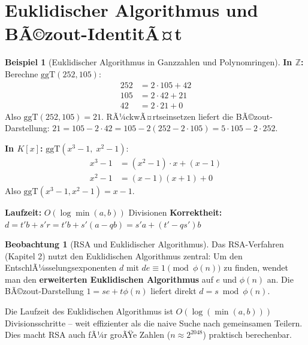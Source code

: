 ﻿\documentclass[a4paper,12pt]{report}
\theoremstyle{definition}
\newtheorem{beispiel}{Beispiel}
\newtheorem{beobachtung}{Beobachtung}
\begin{document}
\section{Euklidischer Algorithmus und BÃ©zout-IdentitÃ¤t}

\begin{beispiel}[Euklidischer Algorithmus in Ganzzahlen und Polynomringen]
    \textbf{In $\mathbb{Z}$:} Berechne $\mathrm{ggT}(252, 105)$:
    \begin{align*}
        252 &= 2 \cdot 105 + 42 \\
        105 &= 2 \cdot 42 + 21 \\
        42  &= 2 \cdot 21 + 0
    \end{align*}
    Also $\mathrm{ggT}(252, 105) = 21$. RÃ¼ckwÃ¤rtseinsetzen liefert die
    BÃ©zout-Darstellung: $21 = 105 - 2 \cdot 42 = 105 - 2(252 - 2 \cdot 105)
    = 5 \cdot 105 - 2 \cdot 252$.

    \textbf{In $K[x]$:} $\mathrm{ggT}(x^3 - 1,\; x^2 - 1)$:
    \begin{align*}
        x^3 - 1 &= (x^2 - 1) \cdot x + (x - 1) \\
        x^2 - 1 &= (x-1)(x+1) + 0
    \end{align*}
    Also $\mathrm{ggT}(x^3-1, x^2-1) = x - 1$.
\end{beispiel}


\begin{algorithm}[H]
\DontPrintSemicolon
\caption{Erweiterter Euklidischer Algorithmus}\label{alg:euklid}
\BlankLine
\textbf{Laufzeit:} $O(\log\min(a,b))$ Divisionen \quad
\textbf{Korrektheit:} $d = t'b + s'r = t'b + s'(a - qb) = s'a + (t'-qs')b$
\end{algorithm}

\begin{beobachtung}[RSA und Euklidischer Algorithmus]
    Das RSA-Verfahren (Kapitel 2) nutzt den Euklidischen Algorithmus
    zentral: Um den EntschlÃ¼sselungsexponenten $d$ mit $de \equiv 1
    \pmod{\phi(n)}$ zu finden, wendet man den \textbf{erweiterten
    Euklidischen Algorithmus} auf $e$ und $\phi(n)$ an. Die BÃ©zout-Darstellung
    $1 = se + t\phi(n)$ liefert direkt $d = s \bmod \phi(n)$.

    Die Laufzeit des Euklidischen Algorithmus ist $O(\log(\min(a,b)))$
    Divisionsschritte -- weit effizienter als die naive Suche nach
    gemeinsamen Teilern. Dies macht RSA auch fÃ¼r groÃŸe Zahlen
    ($n \approx 2^{2048}$) praktisch berechenbar.
\end{beobachtung}
\end{document}
